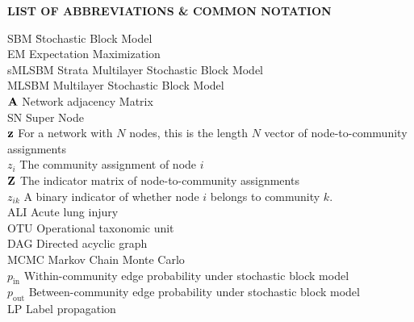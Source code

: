 {}

\begin{center}
{\Large \textbf{LIST OF ABBREVIATIONS \& COMMON NOTATION}}
\end{center}

\newcommand{\Ab}[2]{\noindent  #1 \> #2 \\}
\newcommand{\Abi}[2]{\noindent #1 \hspace{1.5cm} \= #2 \\}

\begin{tabbing}
\Abi{SBM}{Stochastic Block Model}
\Ab{EM}{Expectation Maximization}
\Ab{sMLSBM}{Strata Multilayer Stochastic Block Model}
\Ab{MLSBM}{Multilayer Stochastic Block Model}
\Ab{${\bf A}$}{Network adjacency Matrix}
\Ab{SN}{Super Node}
\Ab{${\bf z}$}{For a network with $N$ nodes, this is the length $N$ vector of node-to-community assignments}
\Ab{$z_{i}$}{The community assignment of node $i$}
\Ab{${\bf Z}$}{The indicator matrix of node-to-community assignments}
\Ab{$z_{ik}$}{A binary indicator of whether node $i$ belongs to community $k$.}
\Ab{ALI}{Acute lung injury}
\Ab{OTU}{Operational taxonomic unit}
\Ab{DAG}{Directed acyclic graph}
\Ab{MCMC}{Markov Chain Monte Carlo}
\Ab{$p_{\text{in}}$}{Within-community edge probability under stochastic block model}
\Ab{$p_{\text{out}}$}{Between-community edge probability under stochastic block model}
\Ab{LP}{Label propagation}

\end{tabbing}

\clearpage
